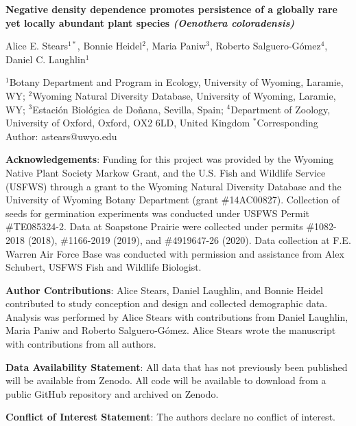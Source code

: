 \documentclass[12pt, letterpaper]{article}
\begin{document}
\begin{flushleft}
\textbf{Negative density dependence promotes persistence of a globally rare yet locally abundant plant species \textit{(Oenothera coloradensis)}}

\normalsize{Alice E. Stears$^{1*}$, Bonnie Heidel$^2$, Maria Paniw$^3$, Roberto Salguero-Gómez$^4$, Daniel C. Laughlin$^1$}

\small{$^1$Botany Department and Program in Ecology, University of Wyoming, Laramie, WY; \linebreak
$^2$Wyoming Natural Diversity Database, University of Wyoming, Laramie, WY; \linebreak
$^3$Estación Biológica de Doñana, Sevilla, Spain; \linebreak
$^4$Department of Zoology, University of Oxford, Oxford, OX2 6LD, United Kingdom}\linebreak
\small{$^*$Corresponding Author: astears@uwyo.edu}

\textbf{Acknowledgements}: Funding for this project was provided by the Wyoming Native Plant Society Markow Grant, and the U.S. Fish and Wildlife Service (USFWS) through a grant to the Wyoming Natural Diversity Database and the University of Wyoming Botany Department (grant \#14AC00827). Collection of seeds for germination experiments was conducted under USFWS Permit \#TE085324-2. Data at Soapstone Prairie were collected under permits \#1082-2018 (2018), \#1166-2019 (2019), and \#4919647-26 (2020). Data collection at F.E. Warren Air Force Base was conducted with permission and assistance from Alex Schubert, USFWS Fish and Wildlife Biologist. 

\textbf{Author Contributions}: Alice Stears, Daniel Laughlin, and Bonnie Heidel contributed to study conception and design and collected demographic data. Analysis was performed by Alice Stears with contributions from Daniel Laughlin, Maria Paniw and Roberto Salguero-Gómez. Alice Stears wrote the manuscript with contributions from all authors. 

\textbf{Data Availability Statement}: All data that has not previously been published will be available from Zenodo. All code will be available to download from a public GitHub repository and archived on Zenodo.

\textbf{Conflict of Interest Statement}: The authors declare no conflict of interest. 

\end{flushleft}
\end{document}
